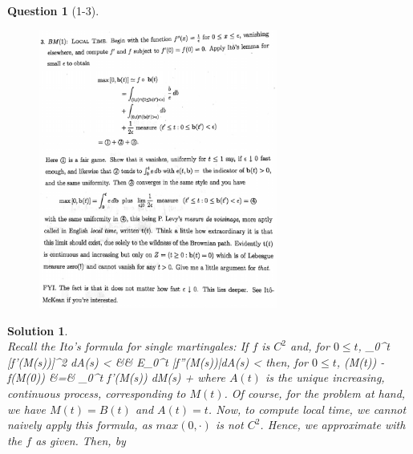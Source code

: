 \documentclass[11pt]{article}
\theoremstyle{plain}
\def\eQb#1\eQe{\begin{eqnarray*}#1\end{eqnarray*}}
\theoremstyle{quest}
\newtheorem*{question}{Question}
\newtheorem*{solution}{Solution}
\begin{document}
\newpage

\begin{question}[1-3]
\hfill
\begin{figure}[h!]
  \centering
    \includegraphics[width=0.7\textwidth]{limthm2-f-p3.png}
\end{figure}
\end{question}
\begin{solution} \hfill \\
Recall the Ito's formula for single martingales: If $f$ is $C^2$ and, for $0 \leq t$,
\eQb
E\int_{0}^{t} [f'(M(s))]^2 dA(s) < \infty \>\>\> && \>\>\> E\int_{0}^{t} 
|f''(M(s))|dA(s) < \infty
\eQe
then, for $0 \leq t$,
\eQb
f(M(t)) - f(M(0)) &=& \int_{0}^{t} f'(M(s)) dM(s) + 
\eQe
where $A(t)$ is the unique increasing, continuous process, corresponding to $M(t)$.
Of course, for the problem at hand, we have $M(t) = B(t)$ and $A(t) = t$. Now, 
to compute local time, we cannot naively apply this formula, as $max(0,\cdot)$ is 
not $C^2$. Hence, we approximate with the $f$ as given. Then, by  
\end{solution}

\newpage
\end{document}
